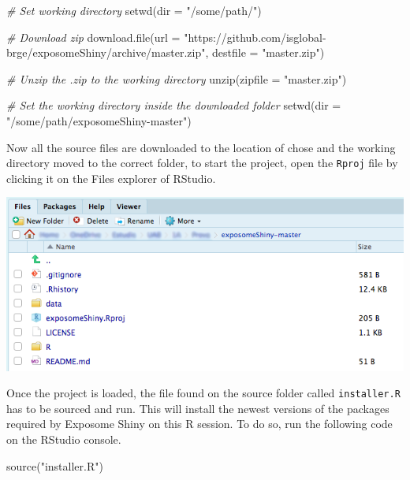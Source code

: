 \documentclass[
]{book}
\newenvironment{Shaded}{\begin{snugshade}}{\end{snugshade}}
\newcommand{\AttributeTok}[1]{\textcolor[rgb]{0.77,0.63,0.00}{#1}}
\newcommand{\CommentTok}[1]{\textcolor[rgb]{0.56,0.35,0.01}{\textit{#1}}}
\newcommand{\FunctionTok}[1]{\textcolor[rgb]{0.00,0.00,0.00}{#1}}
\newcommand{\NormalTok}[1]{#1}
\newcommand{\StringTok}[1]{\textcolor[rgb]{0.31,0.60,0.02}{#1}}
\begin{document}
\begin{Shaded}
\begin{Highlighting}[]
  \CommentTok{\# Set working directory}
\FunctionTok{setwd}\NormalTok{(}\AttributeTok{dir =} \StringTok{"/some/path/"}\NormalTok{)}
      
  \CommentTok{\# Download zip}
\FunctionTok{download.file}\NormalTok{(}\AttributeTok{url =} \StringTok{"https://github.com/isglobal{-}brge/exposomeShiny/archive/master.zip"}\NormalTok{, }\AttributeTok{destfile =} \StringTok{"master.zip"}\NormalTok{)}

  \CommentTok{\# Unzip the .zip to the working directory}
\FunctionTok{unzip}\NormalTok{(}\AttributeTok{zipfile =} \StringTok{"master.zip"}\NormalTok{)}

  \CommentTok{\# Set the working directory inside the downloaded folder}
\FunctionTok{setwd}\NormalTok{(}\AttributeTok{dir =} \StringTok{"/some/path/exposomeShiny{-}master"}\NormalTok{)}
\end{Highlighting}
\end{Shaded}

Now all the source files are downloaded to the location of chose and the working directory moved to the correct folder, to start the project, open the \texttt{Rproj} file by clicking it on the Files explorer of RStudio.

\includegraphics{images/setup1.png}

Once the project is loaded, the file found on the source folder called \texttt{installer.R} has to be sourced and run. This will install the newest versions of the packages required by Exposome Shiny on this R session. To do so, run the following code on the RStudio console.

\begin{Shaded}
\begin{Highlighting}[]
\FunctionTok{source}\NormalTok{(}\StringTok{"installer.R"}\NormalTok{)}
\end{Highlighting}
\end{Shaded}
\end{document}
